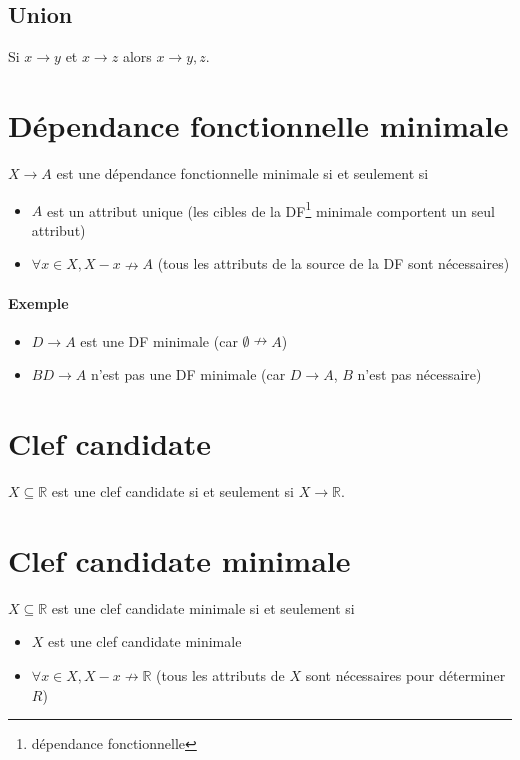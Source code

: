 \documentclass[10pt]{article}
\begin{document}
        \subsection{Union}
            Si $x\rightarrow y$ et $x\rightarrow z$ alors $x\rightarrow y,z$.

    \section{Dépendance fonctionnelle minimale}
        $X\rightarrow A$ est une dépendance fonctionnelle minimale si et seulement si
        \begin{itemize}
            \item $A$ est un attribut unique (les cibles de la DF\footnote{dépendance fonctionnelle} minimale comportent un seul attribut)
            \item $\forall x\in X, X-x\nrightarrow A$ (tous les attributs de la source de la DF sont nécessaires)
        \end{itemize}

        \paragraph{Exemple}
            \begin{itemize}
                \item $D\rightarrow A$ est une DF minimale (car $\emptyset\nrightarrow A$)
                \item $BD\rightarrow A$ n'est pas une DF minimale (car $D\rightarrow A$, $B$ n'est pas nécessaire)
            \end{itemize}    

    \section{Clef candidate}
        $X\subseteq \mathbb{R}$ est une clef candidate si et seulement si $X\rightarrow \mathbb{R}$.

    \section{Clef candidate minimale}
        $X\subseteq \mathbb{R}$ est une clef candidate minimale si et seulement si
        \begin{itemize}
            \item $X$ est une clef candidate minimale
            \item $\forall x\in X, X-x\nrightarrow \mathbb{R}$ (tous les attributs de $X$ sont nécessaires pour déterminer $R$)
        \end{itemize}
\end{document}
